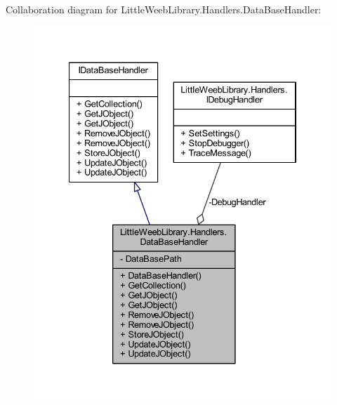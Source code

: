 Collaboration diagram for Little\+Weeb\+Library.\+Handlers.\+Data\+Base\+Handler\+:\nopagebreak
\begin{figure}[H]
\begin{center}
\leavevmode
\includegraphics[width=334pt]{class_little_weeb_library_1_1_handlers_1_1_data_base_handler__coll__graph}
\end{center}
\end{figure}
